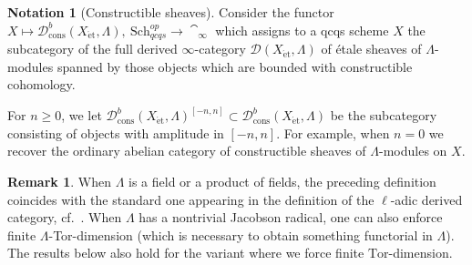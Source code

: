 \documentclass[reqno]{amsart}
\newcommand{\et}{\mathrm{\acute{e}t}}
\newcommand{\D}{\mathcal{D}}
\theoremstyle{definition}
\newtheorem{remark}[theorem]{Remark}
\newtheorem{notation}[theorem]{Notation}
\begin{document}
\begin{notation}[Constructible sheaves]
Consider the functor $X \mapsto \D^b_{\mathrm{cons}}(X_{\et}, \Lambda),    \ \mathrm{Sch}_{qcqs}^{op} \to \cat_\infty$
which assigns to a qcqs scheme
$X$ the subcategory of the full derived $\infty$-category $\D(X_{\et}, \Lambda)$ of \'etale
sheaves of $\Lambda$-modules spanned by those objects which are bounded with constructible
cohomology. 

For $n \geq 0$, 
we let $\D^b_{\mathrm{cons}}(X_{\et}, \Lambda)^{[-n, n]} \subset \D^b_{\mathrm{cons}}(X_{\et}, \Lambda)$ be the subcategory
consisting of objects with amplitude in $[-n, n]$. 
For example, when $n = 0$ we recover the ordinary abelian category of
constructible sheaves of $\Lambda$-modules on $X$.  
\end{notation}

\begin{remark}
When $\Lambda$ is a field or a product of fields, the preceding definition
coincides with the standard one appearing in the definition of the $\ell$-adic
derived category, cf.~\cite[Tag 09C0]{stacks-project}. When $\Lambda$ has a
nontrivial Jacobson radical, 
one can also enforce finite $\Lambda$-Tor-dimension (which is necessary to
obtain something functorial in $\Lambda$). 
The results below also hold for the variant where we force finite
$\mathrm{Tor}$-dimension. 
\end{remark}
\end{document}
